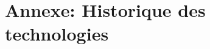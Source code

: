 \documentclass[a4paper,11pt,twoside]{report}
\begin{document}








\newpage

\section*{Annexe: Historique des technologies}
\end{document}

